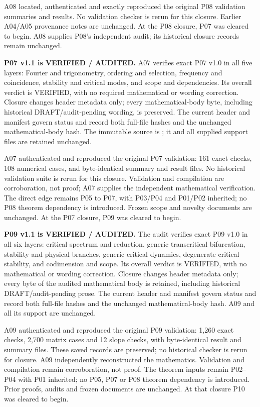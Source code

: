 \documentclass[11pt]{article}
\begin{document}
\smallskip\noindent A08 located, authenticated and exactly reproduced
the original P08 validation summaries and results. No validation checker
is rerun for this closure. Earlier A04/A05 provenance notes are unchanged.
At the P08 closure, P07 was cleared to begin. A08 supplies P08's independent
audit; its historical closure records remain unchanged.

\smallskip\noindent\textbf{P07 v1.1 is VERIFIED / AUDITED.}
A07 verifies exact P07 v1.0 in all five layers: Fourier and trigonometry,
ordering and selection, frequency and coincidence, stability and critical
modes, and scope and dependencies. Its overall verdict is VERIFIED, with no required
mathematical or wording correction. Closure changes header metadata only;
every mathematical-body byte, including historical DRAFT/audit-pending
wording, is preserved. The current header and manifest govern status and
record both full-file hashes and the unchanged mathematical-body hash.
The immutable source is ;
it and all supplied support files are retained unchanged.

\smallskip\noindent A07 authenticated and reproduced the original P07
validation: 161 exact checks, 108 numerical cases, and byte-identical
summary and result files. No historical validation suite is rerun for
this closure. Validation and compilation are corroboration, not proof;
A07 supplies the independent mathematical verification. The direct edge
remains P05 to P07, with P03/P04 and P01/P02 inherited; no P08 theorem
dependency is introduced. Frozen scope and novelty documents are unchanged.
At the P07 closure, P09 was cleared to begin.

\smallskip\noindent\textbf{P09 v1.1 is VERIFIED / AUDITED.}
The audit 
verifies exact P09 v1.0 in all six layers: critical spectrum and reduction,
generic transcritical bifurcation, stability and physical branches, generic
critical dynamics, degenerate critical stability, and codimension and scope.
Its overall verdict is VERIFIED, with no mathematical or wording correction.
Closure changes header metadata only; every byte of the audited mathematical
body is retained, including historical DRAFT/audit-pending prose. The current
header and manifest govern status and record both full-file hashes and the
unchanged mathematical-body hash. A09 and all its support are unchanged.

\smallskip\noindent A09 authenticated and reproduced the original P09
validation: 1,260 exact checks, 2,700 matrix cases and 12 slope checks,
with byte-identical result and summary files. These saved records are
preserved; no historical checker is rerun for closure. A09 independently
reconstructed the mathematics. Validation and compilation remain
corroboration, not proof. The theorem inputs remain P02--P04 with P01
inherited; no P05, P07 or P08 theorem dependency is introduced.
Prior proofs, audits and frozen documents are unchanged.
At that closure P10 was cleared to begin.
\end{document}
